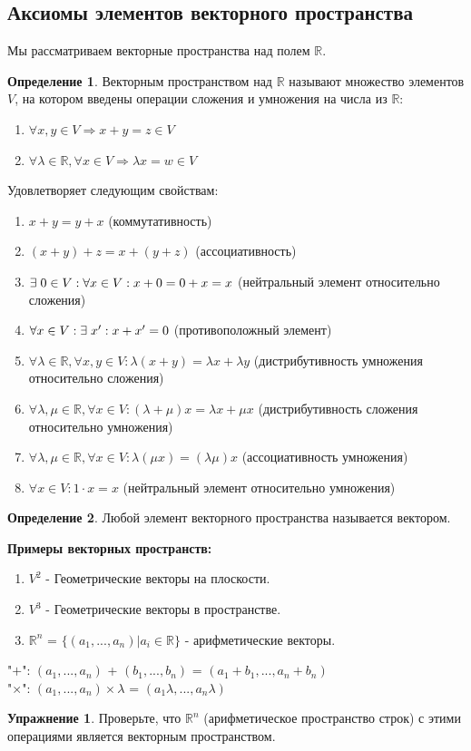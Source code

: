 \documentclass[a4paper, 12pt]{article}
\newcommand{\R}{\mathbb R}
\newcommand\tab[1][.5cm]{\hspace*{#1}}
\theoremstyle{definition}
\newtheorem*{definition}{Определение}
\newtheorem*{lalala}{Упражнение}
\begin{document}
  \subsection{Аксиомы элементов векторного пространства}
  Мы рассматриваем векторные пространства над полем $\R$.
  \begin{definition}
    Векторным пространством над $\R$ называют множество элементов $V$, на котором введены операции сложения и умножения на числа из $\R$:
    \begin{enumerate}
      \item $ \forall x,y \in V \Longrightarrow x+y=z \in V$
      \item $\forall \lambda \in \R, \forall x \in V \Longrightarrow \lambda x = w \in V$ 
    \end{enumerate}
    Удовлетворяет следующим свойствам:
    \begin{enumerate}
      \item $x+y = y+x$ (коммутативность)
      \item $(x+y)+z = x+(y+z)$ (ассоциативность)
      \item $\exists \tab[0.1cm] 0 \in V: \forall x \in V: x+0 = 0+x = x$ (нейтральный элемент относительно сложения)
      \item $\forall x \in V: \exists \tab[0.1cm] x^{\prime}: x + x^{\prime} = 0$ (противоположный элемент)
      \item $\forall \lambda \in \R, \forall x,y \in V: \lambda (x+y) = \lambda x + \lambda y$ (дистрибутивность умножения относительно сложения)
      \item $\forall \lambda, \mu \in \R, \forall x \in V: (\lambda+\mu)x = \lambda x + \mu x $ (дистрибутивность сложения относительно умножения)
      \item $\forall \lambda, \mu \in \R, \forall x \in V: \lambda(\mu x) = (\lambda \mu) x $ (ассоциативность умножения)
      \item $\forall x \in V: 1 \cdot x = x$ (нейтральный элемент относительно умножения)
    \end{enumerate}
  \end{definition} 

  \begin{definition}
    Любой элемент векторного пространства называется вектором.
  \end{definition} 

  \textbf{Примеры векторных пространств:} 
    \begin{enumerate} 
      \item $V^2$ - Геометрические векторы на плоскости.
      \item $V^3$ - Геометрические векторы в пространстве.
      \item $\R^n$ = $\{ {(a_1,...,a_n) | a_i \in \R} \}$ - арифметические векторы.
    \end{enumerate}
    \tab[0.8cm]"$+$": $(a_1,...,a_n)$ + $(b_1,...,b_n)$ = $(a_1+b_1,...,a_n+b_n)$ \\
    \tab[0.8cm]"$\times$": $(a_1,...,a_n) \times \lambda$ = $(a_1\lambda,...,a_n\lambda)$ 
  \begin{lalala}
    Проверьте, что $\R^n$ (арифметическое пространство строк) с этими операциями является векторным пространством. 
  \end{lalala}  
\end{document}
